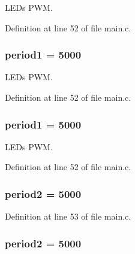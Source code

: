L\-E\-Ds P\-W\-M. 



Definition at line 52 of file main.\-c.

\hypertarget{group___revolution_b_l_gabe751b3d399e053031c1e3db20b6b071}{
\subsubsection[{period1}]{ period1 = 5000}}\label{group___revolution_b_l_gabe751b3d399e053031c1e3db20b6b071}


L\-E\-Ds P\-W\-M. 



Definition at line 52 of file main.\-c.

\hypertarget{group___revolution_b_l_gabe751b3d399e053031c1e3db20b6b071}{
\subsubsection[{period1}]{ period1 = 5000}}\label{group___revolution_b_l_gabe751b3d399e053031c1e3db20b6b071}


L\-E\-Ds P\-W\-M. 



Definition at line 52 of file main.\-c.

\hypertarget{group___revolution_b_l_gadf8633b43922fbf4f1d86981daf74ccc}{
\subsubsection[{period2}]{ period2 = 5000}}\label{group___revolution_b_l_gadf8633b43922fbf4f1d86981daf74ccc}


Definition at line 53 of file main.\-c.

\hypertarget{group___revolution_b_l_gadf8633b43922fbf4f1d86981daf74ccc}{
\subsubsection[{period2}]{ period2 = 5000}}\label{group___revolution_b_l_gadf8633b43922fbf4f1d86981daf74ccc}


